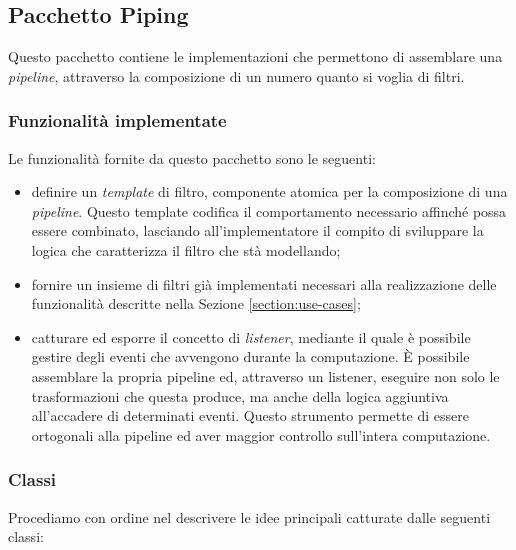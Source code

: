 \subsection{Pacchetto Piping}
\label{subsection:piping-package-description}
Questo pacchetto contiene le implementazioni che permettono di
assemblare una \emph{pipeline}, attraverso la composizione di un
numero quanto si voglia di filtri. 

\subsubsection*{Funzionalit\`a implementate}

Le funzionalit\`a fornite da questo pacchetto sono le seguenti:
\begin{itemize}
\item definire un \emph{template} di filtro, componente atomica per la
  composizione di una \emph{pipeline}. Questo template codifica il
  comportamento necessario affinch\'e possa essere combinato,
  lasciando all'implementatore il compito di sviluppare la logica che
  caratterizza il filtro che st\`a modellando;
\item fornire un insieme di filtri gi\`a implementati necessari alla
  realizzazione delle funzionalit\`a descritte nella Sezione
  \ref{section:use-cases};
\item catturare ed esporre il concetto di \emph{listener}, mediante il
  quale \`e possibile gestire degli eventi che avvengono durante la
  computazione. \`E possibile assemblare la propria pipeline ed,
  attraverso un listener, eseguire non solo le trasformazioni che
  questa produce, ma anche della logica aggiuntiva all'accadere di
  determinati eventi. Questo strumento permette di essere ortogonali
  alla pipeline ed aver maggior controllo sull'intera computazione.
\end{itemize}

\subsubsection*{Classi}
Procediamo con ordine nel descrivere le idee principali catturate
dalle seguenti classi:

